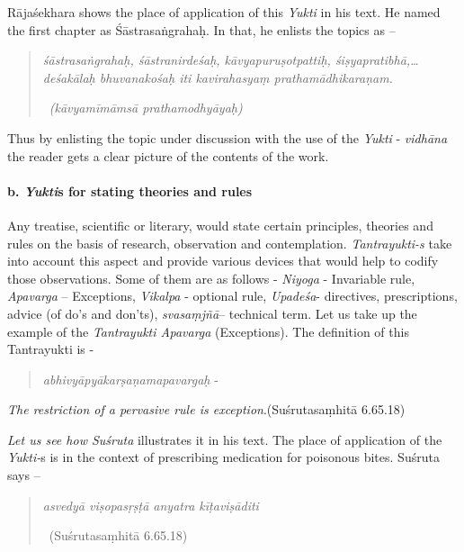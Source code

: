 Rājaśekhara shows the place of application of this \textit{Yukti} in his text. He named the first chapter as Śāstrasaṅgrahaḥ. In that, he enlists the topics as –

\begin{quote}
\textit{śāstrasaṅgrahaḥ, śāstranirdeśaḥ, kāvyapuruṣotpattiḥ, śiṣyapra\-tibhā,…deśakālaḥ bhuvanakośaḥ iti kavirahasyaṃ prathamādhi\-karaṇam.}

~\hfill \textit{(kāvyamīmāmsā prathamodhyāyaḥ)}
\end{quote}

Thus by enlisting the topic under discussion with the use of the \textit{Yukti} - \textit{vidhāna} the reader gets a clear picture of the contents of the work.


\paragraph*{b. \textit{Yukti}s for stating theories and rules}

Any treatise, scientific or literary, would state certain principles, theories and rules on the basis of research, observation and contemplation. \textit{Tantrayukti-s} take into account this aspect and provide various devices that would help to codify those observations. Some of them are as follows - \textit{Niyoga} - Invariable rule, \textit{Apavarga} – Exceptions, \textit{Vikalpa} - optional rule, \textit{Upadeśa}- directives, prescriptions, advice (of do’s and don’ts), \textit{svasaṃjñā}– technical term. Let us take up the example of the \textit{Tantrayukti Apavarga} (Exceptions). The definition of this Tantrayukti is -

\begin{verse}
\textit{abhivyāpyākarṣaṇamapavargaḥ} -
\end{verse}

\begin{myquote}
\textit{The restriction of a pervasive rule is exception}.\hfill (Suśrutasaṃhitā 6.65.18)
\end{myquote}

\textit{Let us see how Suśruta} illustrates it in his text. The place of application of the \textit{Yukti-}s is in the context of prescribing medication for poisonous bites. Suśruta says –

\begin{verse}
\textit{asvedyā viṣopasṛṣṭā anyatra kīṭaviṣāditi}

~\hfill (Suśrutasaṃhitā 6.65.18)
\end{verse}

